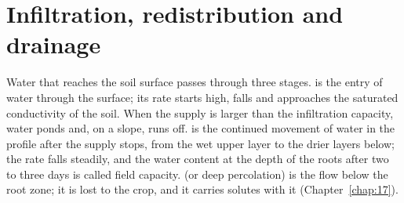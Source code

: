 \section{Infiltration, redistribution and drainage}
Water that reaches the soil surface passes through three stages.  is the entry of water through the surface; its rate starts high, falls and approaches the saturated conductivity of the soil. When the supply is larger than the infiltration capacity, water ponds and, on a slope, runs off.  is the continued movement of water in the profile after the supply stops, from the wet upper layer to the drier layers below; the rate falls steadily, and the water content at the depth of the roots after two to three days is called field capacity.  (or deep percolation) is the flow below the root zone; it is lost to the crop, and it carries solutes with it (Chapter~\ref{chap:17}).
